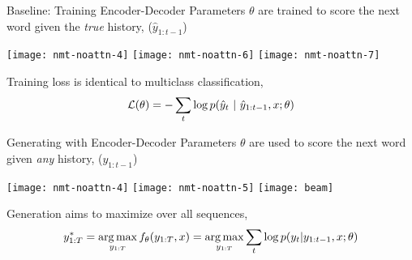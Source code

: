 





\begin{frame}{Baseline: Training Encoder-Decoder}
  Parameters $\theta$ are trained to score the next word given the \textit{true} history, ($\hat{y}_{1:t-1}$)

  \begin{center}
  \texttt{[image: nmt-noattn-4]}
  \texttt{[image: nmt-noattn-6]}
  \texttt{[image: nmt-noattn-7]}
  \end{center}

  Training loss is identical to \textcolor{redpurple}{multiclass classification},
  \[ {\cal L}(\theta) = -\sum_{t} \log p(\hat{y}_t\ |\  \hat{y}_{1:t-1}, x; \theta) \]
\end{frame}

\begin{frame}{Generating with Encoder-Decoder}
  Parameters $\theta$ are used to score the next word given \textit{any} history, ($y_{1:t-1}$)


  \begin{center}
  \texttt{[image: nmt-noattn-4]}
  \texttt{[image: nmt-noattn-5]}
  \texttt{[image: beam]}
  \end{center}

  Generation aims to maximize over all sequences,
  \[ y^*_{1:T} =\argmax_{y_{1:T}} f_{\theta}(y_{1:T}, x) = \argmax_{y_{1:T}} \sum_{t} \log p(y_{t} | y_{1:t-1}, x; \theta) \]

\end{frame}

